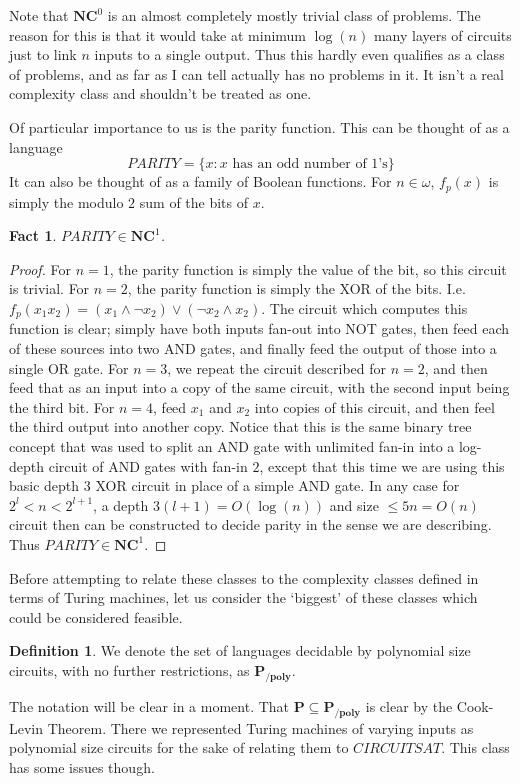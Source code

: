 \documentclass{article}
\theoremstyle{definition}
\newtheorem{definition}{Definition}[section]
\theoremstyle{plain}
\theoremstyle{theorem}
\newtheorem{fact}{Fact}[section]
\begin{document}
Note that $\bm{NC}^0$ is an almost completely mostly trivial class of problems. The reason for this is that it would take at minimum $\log(n)$ many layers of circuits just to link $n$ inputs to a single output. Thus this hardly even qualifies as a class of problems, and as far as I can tell actually has no problems in it. It isn't a real complexity class and shouldn't be treated as one. \par 
Of particular importance to us is the parity function. This can be thought of as a language
\[ PARITY = \{x: x \textrm{ has an odd number of $1$'s}\} \]
It can also be thought of as a family of Boolean functions. For $n \in \omega$, $f_p(x)$ is simply the modulo $2$ sum of the bits of $x$. 
\begin{fact}
	$PARITY \in \bm{NC}^1$. 
\end{fact}
\begin{proof}
	For $n=1$, the parity function is simply the value of the bit, so this circuit is trivial. For $n=2$, the parity function is simply the XOR of the bits. I.e. $f_p(x_1x_2) = (x_1 \wedge \neg x_2) \vee (\neg x_2 \wedge x_2)$. The circuit which computes this function is clear; simply have both inputs fan-out into NOT gates, then feed each of these sources into two AND gates, and finally feed the output of those into a single OR gate. For $n=3$, we repeat the circuit described for $n=2$, and then feed that as an input into a copy of the same circuit, with the second input being the third bit. For $n=4$, feed $x_1$ and $x_2$ into copies of this circuit, and then feel the third output into another copy. Notice that this is the same binary tree concept that was used to split an AND gate with unlimited fan-in into a log-depth circuit of AND gates with fan-in $2$, except that this time we are using this basic depth $3$ XOR circuit in place of a simple AND gate. In any case for $2^l < n < 2^{l+1}$, a depth $3(l+1) = O(\log(n))$ and size $\leq 5n = O(n)$ circuit then can be constructed to decide parity in the sense we are describing. Thus $PARITY \in \bm{NC}^1$.
\end{proof}
Before attempting to relate these classes to the complexity classes defined in terms of Turing machines, let us consider the `biggest' of these classes which could be considered feasible.
\begin{definition}
	We denote the set of languages decidable by polynomial size circuits, with no further restrictions, as $\bm{P_{/poly}}$.
\end{definition}
The notation will be clear in a moment. That $\bm{P} \subseteq \bm{P_{/poly}}$ is clear by the Cook-Levin Theorem. There we represented Turing machines of varying inputs as polynomial size circuits for the sake of relating them to $CIRCUITSAT$. This class has some issues though. 
\end{document}
